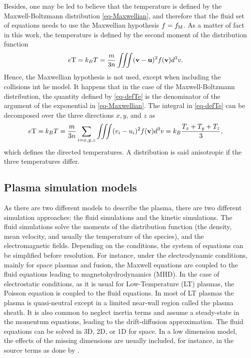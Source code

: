 Besides, one may be led to believe that the temperature is defined by the Maxwell-Boltzmann distribution \cref{eq-Maxwellian}, and therefore that the fluid set of equations needs to use the Maxwellian hypothesis $f = f_{\rm M}$.
As a matter of fact in this work, the temperature is defined by the second moment of the distribution function
\begin{equation} \label{eq-defTe}
  e {\rm T} = k_B T = \frac{m}{3 n} \iiint ({\mathbf v} - {\mathbf u})^2 f({\mathbf v}) d^3v.
\end{equation}
Hence, the Maxwellian hypothesis is not used, except when including the collisions int he model.
It happens that in the case of the Maxwell-Boltzmann distribution, the quantity defined by \cref{eq-defTe} is the denominator of the argument of the exponential in \cref{eq-Maxwellian}.
The integral in \cref{eq-defTe} can be decomposed over the three directions $x,y$, and $z$ as
\begin{equation} \label{eq-3Te}
  e {\rm T} = k_B T = \frac{m}{3 n} \sum_{i=x,y,z} \iiint (v_i - u_i)^2 f({\mathbf v}) d^3v = k_B \frac{ T_x + T_y + T_z}{3},
\end{equation}
which defines the directed temperatures.
A distribution is said anisotropic if the three temperatures differ.

\subsection{Plasma simulation models} \label{subsec-simulations}
As there are two different models to describe the plasma, there are two different simulation approaches\string: the fluid simulations and the kinetic simulations.
The fluid simulations solve the moments of the distribution function (the density, mean velocity, and usually the temperature of the species), and the electromagnetic fields.
Depending on the conditions, the system of equations can be simplified before resolution.
For instance, under the electrodynamic conditions, mainly for space plasmas and fusion, the Maxwell equations are coupled to the fluid equations leading to magnetohydrodynamics (MHD).
In the case of electrostatic conditions, as it is usual for Low-Temperature (LT) plasmas, the Poisson equation is coupled to the fluid equations.
In most of LT plasmas the plasma is quasi-neutral except in a limited near-wall region called the plasma sheath.
It is also common to neglect inertia terms and assume a steady-state in the momentum equations, leading to the drift-diffusion approximation.
The fluid equations can be solved in \ac{3D}, \ac{2D}, or \ac{1D} for space.
In a low dimension model, the effects of the missing dimensions are usually included, for instance, in the source terms as done by \citet{barral2003a}.


